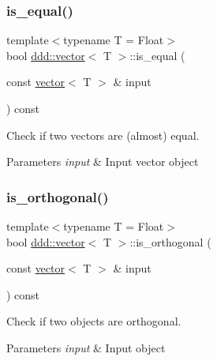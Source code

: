 \subsubsection{\texorpdfstring{is\+\_\+equal()}{is\_equal()}}
{\footnotesize\ttfamily template$<$typename T = Float$>$ \\
bool \hyperlink{classddd_1_1vector}{ddd\+::vector}$<$ T $>$\+::is\+\_\+equal (\begin{DoxyParamCaption}\item[{const \hyperlink{classddd_1_1vector}{vector}$<$ T $>$ \&}]{input }\end{DoxyParamCaption}) const\hspace{0.3cm}{\ttfamily [inline]}}



Check if two vectors are (almost) equal. 


\begin{DoxyParams}{Parameters}
{\em input} & Input vector object \\
\hline
\end{DoxyParams}
\mbox{\label{classddd_1_1vector_aa4093c63121a3787e4b43581f23c3e0a}} 
\subsubsection{\texorpdfstring{is\+\_\+orthogonal()}{is\_orthogonal()}\hspace{0.1cm}{\footnotesize\ttfamily [1/4]}}
{\footnotesize\ttfamily template$<$typename T = Float$>$ \\
bool \hyperlink{classddd_1_1vector}{ddd\+::vector}$<$ T $>$\+::is\+\_\+orthogonal (\begin{DoxyParamCaption}\item[{const \hyperlink{classddd_1_1vector}{vector}$<$ T $>$ \&}]{input }\end{DoxyParamCaption}) const\hspace{0.3cm}{\ttfamily [inline]}}



Check if two objects are orthogonal. 


\begin{DoxyParams}{Parameters}
{\em input} & Input object \\
\hline
\end{DoxyParams}
\mbox{\label{classddd_1_1vector_a318668b4cf5fab06176119fbe4655b39}} 
